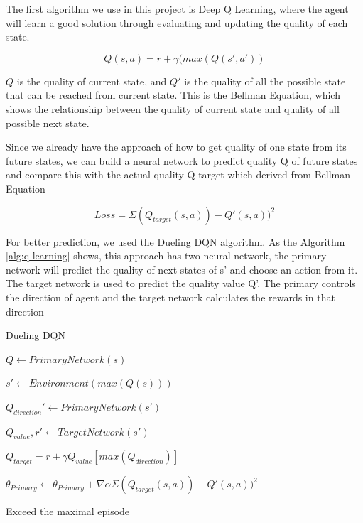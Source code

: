 \documentclass[article]{aaltoseries}
\begin{document}
The first algorithm we use in this project is Deep Q Learning, where the agent will learn a good solution through evaluating and updating the quality of each state. 

\begin{equation} \label{eq:q_learning}
  Q(s,a) = r + \gamma (max(Q(s\prime ,a\prime ))
\end{equation}



$Q$ is the quality of current state, and $Q\prime$ is the quality of all the possible state that can be reached from current state. This is the Bellman Equation, which shows the relationship between the quality of current state and quality of all  possible next state.

Since we already have the approach of how to get quality of one state from its future states, we can build a neural network to predict quality Q of future states and compare this with the actual quality Q-target which derived from Bellman Equation



\begin{equation} \label{eq:q_loss}
  Loss = \Sigma (Q_{target}(s,a)) - Q \prime (s,a))^2
\end{equation}



For better prediction, we used the Dueling DQN algorithm. 
As the Algorithm \ref{alg:q-learning} shows, this approach has two neural network, the primary network will predict the quality of next states of s’ and choose an action from it. The target network is used to predict the quality value Q’. The primary controls the direction of agent and the target network calculates the rewards in that direction




\begin{algorithm}
  \caption{Dueling DQN}
  \label{alg:q-learning}
  \begin{algorithmic}[1]
    \Repeat
      
      \State $Q \gets PrimaryNetwork(s)$  

      \State $s\prime \gets Environment(max(Q(s)))$

      \State $Q_{direction} \prime \gets PrimaryNetwork(s \prime)$ 

      \State $Q_{value} ,r \prime \gets TargetNetwork(s \prime)$
      
      \State $Q_{target} = r + \gamma Q_{value}[max(Q_{direction})]$

      \State $\theta_{Primary} \gets \theta_{Primary}  + \nabla \alpha \Sigma (Q_{target}(s,a)) - Q \prime (s,a))^2$ 

    \Until Exceed the maximal episode
  \end{algorithmic}
\end{algorithm}
\end{document}
